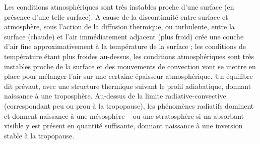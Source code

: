\sk
Les conditions atmosphériques sont très instables proche d'une surface (en présence d'une telle surface). A cause de la discontinuité entre surface et atmosphère, sous l'action de la diffusion thermique, ou turbulente, entre la surface (chaude) et l'air immédiatement adjacent (plus froid) crée une couche d'air fine approximativement à la température de la surface ; les conditions de température étant plus froides au-dessus, les conditions atmosphériques sont très instables proche de la surface et des mouvements de convection vont se mettre en place pour mélanger l'air sur une certaine épaisseur atmosphérique. Un équilibre dit  prévaut, avec une structure thermique suivant le profil adiabatique, donnant naissance à une troposphère. Au-dessus de la limite radiative-convective (correspondant peu ou prou à la tropopause), les phénomènes radiatifs dominent et donnent naissance à une mésosphère -- ou une stratosphère si un absorbant visible y est présent en quantité suffisante, donnant naissance à une inversion stable à la tropopause.










